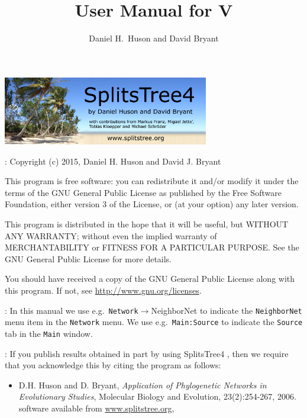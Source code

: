 \documentclass[11pt]{article}
\title{User Manual for \SplitsTree V\VERSION}
\author{Daniel H.~Huson and David Bryant}
\def\SplitsTree{{\sf SplitsTree4 }}
\begin{document}

\maketitle

\begin{center}
\includegraphics[height=3cm]{about.jpg}
\end{center}

\tableofcontents


:
Copyright (c) 2015, Daniel H. Huson and David J. Bryant

This program is free software: you can redistribute it and/or modify
it under the terms of the GNU General Public License as published by
the Free Software Foundation, either version 3 of the License, or
(at your option) any later version.

This program is distributed in the hope that it will be useful,
but WITHOUT ANY WARRANTY; without even the implied warranty of
MERCHANTABILITY or FITNESS FOR A PARTICULAR PURPOSE.  See the
GNU General Public License for more details.

You should have received a copy of the GNU General Public License
along with this program.  If not, see \url{http://www.gnu.org/licenses}.


:
In this manual we use e.g.\ {\tt Network}$\to${NeighborNet} to indicate
the {\tt NeighborNet} menu item in the {\tt Network} menu.
We use e.g.\ {\tt Main:Source} to indicate the {\tt Source} tab in the
{\tt Main} window.

:
If you publish results obtained in part by using \SplitsTree, then we
require that you acknowledge this by citing the program as follows:
\begin{itemize}
\item D.H. Huson and D. Bryant, {\em Application of Phylogenetic Networks
in Evolutionary Studies}, Molecular Biology and Evolution,
23(2):254-267, 2006.
software available from \url{www.splitstree.org},
\end{itemize}
\end{document}
